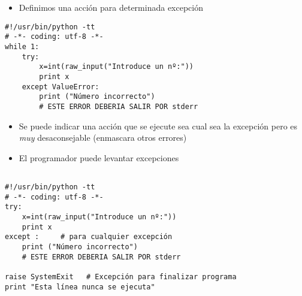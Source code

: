 \documentclass[ucs]{beamer}
\begin{document}


\begin{frame}[fragile]

\begin{itemize}
\item  Definimos una acción para determinada excepción
\end{itemize}

  \begin{scriptsize}
\begin{verbatim}
#!/usr/bin/python -tt
# -*- coding: utf-8 -*-
while 1:
    try:
        x=int(raw_input("Introduce un nº:"))
        print x
    except ValueError:
        print ("Número incorrecto")
        # ESTE ERROR DEBERIA SALIR POR stderr

\end{verbatim}
  \end{scriptsize}


\end{frame}



\begin{frame}[fragile]

\begin{itemize}
\item Se puede indicar una acción que se ejecute sea cual sea la
     excepción
      pero es \emph{muy} desaconsejable (enmascara otros errores)
\item  El programador puede levantar excepciones
\end{itemize}

  \begin{scriptsize}
\begin{verbatim}

#!/usr/bin/python -tt
# -*- coding: utf-8 -*-
try:
    x=int(raw_input("Introduce un nº:"))
    print x
except :     # para cualquier excepción
    print ("Número incorrecto")
    # ESTE ERROR DEBERIA SALIR POR stderr

raise SystemExit   # Excepción para finalizar programa
print "Esta línea nunca se ejecuta"
\end{verbatim}
  \end{scriptsize}


\end{frame}


\end{document}
